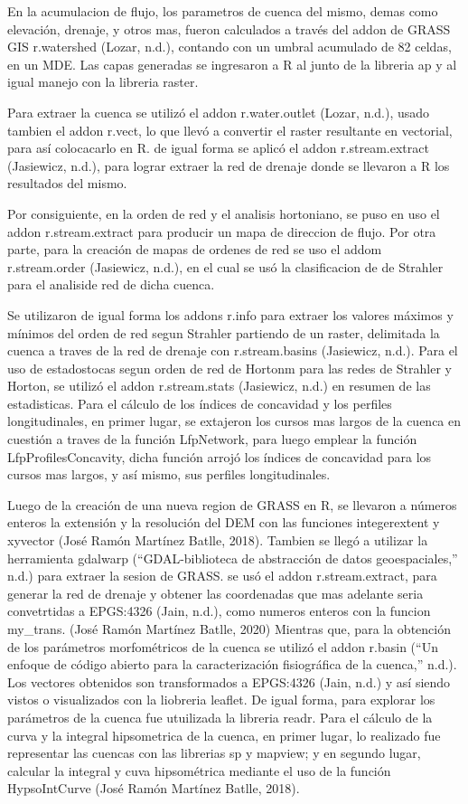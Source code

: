 \documentclass[11pt,]{article}
\begin{document}
En la acumulacion de flujo, los parametros de cuenca del mismo, demas
como elevación, drenaje, y otros mas, fueron calculados a través del
addon de GRASS GIS r.watershed (Lozar, n.d.), contando con un umbral
acumulado de 82 celdas, en un MDE. Las capas generadas se ingresaron a R
al junto de la libreria ap y al igual manejo con la libreria raster.

Para extraer la cuenca se utilizó el addon r.water.outlet (Lozar, n.d.),
usado tambien el addon r.vect, lo que llevó a convertir el raster
resultante en vectorial, para así colocacarlo en R. de igual forma se
aplicó el addon r.stream.extract (Jasiewicz, n.d.), para lograr extraer
la red de drenaje donde se llevaron a R los resultados del mismo.

Por consiguiente, en la orden de red y el analisis hortoniano, se puso
en uso el addon r.stream.extract para producir un mapa de direccion de
flujo. Por otra parte, para la creación de mapas de ordenes de red se
uso el addom r.stream.order (Jasiewicz, n.d.), en el cual se usó la
clasificacion de de Strahler para el analiside red de dicha cuenca.

Se utilizaron de igual forma los addons r.info para extraer los valores
máximos y mínimos del orden de red segun Strahler partiendo de un
raster, delimitada la cuenca a traves de la red de drenaje con
r.stream.basins (Jasiewicz, n.d.). Para el uso de estadostocas segun
orden de red de Hortonm para las redes de Strahler y Horton, se utilizó
el addon r.stream.stats (Jasiewicz, n.d.) en resumen de las
estadisticas. Para el cálculo de los índices de concavidad y los
perfiles longitudinales, en primer lugar, se extajeron los cursos mas
largos de la cuenca en cuestión a traves de la función LfpNetwork, para
luego emplear la función LfpProfilesConcavity, dicha función arrojó los
índices de concavidad para los cursos mas largos, y así mismo, sus
perfiles longitudinales.

Luego de la creación de una nueva region de GRASS en R, se llevaron a
números enteros la extensión y la resolución del DEM con las funciones
integerextent y xyvector (José Ramón Martínez Batlle, 2018). Tambien se
llegó a utilizar la herramienta gdalwarp (``GDAL-biblioteca de
abstracción de datos geoespaciales,'' n.d.) para extraer la sesion de
GRASS. se usó el addon r.stream.extract, para generar la red de drenaje
y obtener las coordenadas que mas adelante seria convetrtidas a
EPGS:4326 (Jain, n.d.), como numeros enteros con la funcion my\_trans.
(José Ramón Martínez Batlle, 2020) Mientras que, para la obtención de
los parámetros morfométricos de la cuenca se utilizó el addon r.basin
(``Un enfoque de código abierto para la caracterización fisiográfica de
la cuenca,'' n.d.). Los vectores obtenidos son transformados a EPGS:4326
(Jain, n.d.) y así siendo vistos o visualizados con la liobreria
leaflet. De igual forma, para explorar los parámetros de la cuenca fue
utuilizada la libreria readr. Para el cálculo de la curva y la integral
hipsometrica de la cuenca, en primer lugar, lo realizado fue representar
las cuencas con las librerias sp y mapview; y en segundo lugar, calcular
la integral y cuva hipsométrica mediante el uso de la función
HypsoIntCurve (José Ramón Martínez Batlle, 2018).
\end{document}
